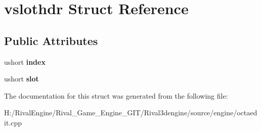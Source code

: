 \hypertarget{structvslothdr}{}\section{vslothdr Struct Reference}
\label{structvslothdr}
\subsection*{Public Attributes}
\begin{DoxyCompactItemize}
\item 
\mbox{\label{structvslothdr_a4fd839473655ad44e92bcd6cf421e0c2}} 
ushort {\bfseries index}
\item 
\mbox{\label{structvslothdr_ac5665bf6aa85949fa928383fdaaca360}} 
ushort {\bfseries slot}
\end{DoxyCompactItemize}


The documentation for this struct was generated from the following file\+:\begin{DoxyCompactItemize}
\item 
H\+:/\+Rival\+Engine/\+Rival\+\_\+\+Game\+\_\+\+Engine\+\_\+\+G\+I\+T/\+Rival3dengine/source/engine/octaedit.\+cpp\end{DoxyCompactItemize}
